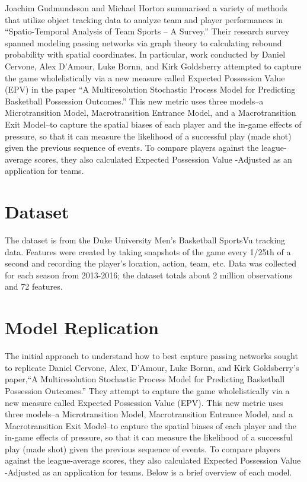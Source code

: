 \documentclass[12pt,twoside]{dukestatscithesis}
\theoremstyle{definition}
\theoremstyle{definition}
\theoremstyle{definition}
\theoremstyle{remark}
\begin{document}
Joachim Gudmundsson and Michael Horton summarised a variety of methods
that utilize object tracking data to analyze team and player
performances in ``Spatio-Temporal Analysis of Team Sports -- A Survey.''
Their research survey spanned modeling passing networks via graph theory
to calculating rebound probability with spatial coordinates. In
particular, work conducted by Daniel Cervone, Alex D'Amour, Luke Bornn,
and Kirk Goldsberry attempted to capture the game wholelistically via a
new measure called Expected Possession Value (EPV) in the paper ``A
Multiresolution Stochastic Process Model for Predicting Basketball
Possession Outcomes.'' This new metric uses three models--a
Microtransition Model, Macrotransition Entrance Model, and a
Macrotransition Exit Model--to capture the spatial biases of each player
and the in-game effects of pressure, so that it can measure the
likelihood of a successful play (made shot) given the previous sequence
of events. To compare players against the league-average scores, they
also calculated Expected Possession Value -Adjusted as an application
for teams.

\chapter{Dataset}\label{dataset}

The dataset is from the Duke University Men's Basketball SportsVu
tracking data. Features were created by taking snapshots of the game
every 1/25th of a second and recording the player's location, action,
team, etc. Data was collected for each season from 2013-2016; the
dataset totals about 2 million observations and 72 features.

\chapter{Model Replication}\label{model-replication}

The initial approach to understand how to best capture passing networks
sought to replicate Daniel Cervone, Alex, D'Amour, Luke Bornn, and Kirk
Goldsberry's paper,``A Multiresolution Stochastic Process Model for
Predicting Basketball Possession Outcomes.'' They attempt to capture the
game wholelistically via a new measure called Expected Possession Value
(EPV). This new metric uses three models--a Microtransition Model,
Macrotransition Entrance Model, and a Macrotransition Exit Model--to
capture the spatial biases of each player and the in-game effects of
pressure, so that it can measure the likelihood of a successful play
(made shot) given the previous sequence of events. To compare players
against the league-average scores, they also calculated Expected
Possession Value -Adjusted as an application for teams. Below is a brief
overview of each model.
\end{document}

